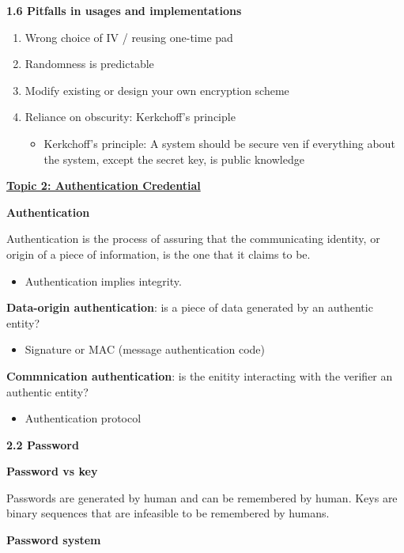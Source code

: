 \documentclass[landscape,a4paper]{extarticle}
\begin{document}
\begin{multicols*}{5}
    \textbf{1.6 Pitfalls in usages and implementations}
    \begin{enumerate}
        \item Wrong choice of IV / reusing one-time pad
        \item Randomness is predictable
        \item Modify existing or design your own encryption scheme
        \item Reliance on obscurity: Kerkchoff's principle
        \begin{itemize}
            \item Kerkchoff's principle: A system should be secure ven if everything about the
            system, except the secret key, is public knowledge
        \end{itemize}
    \end{enumerate}

    \textbf{\uline{Topic 2: Authentication Credential}}

    \textbf{Authentication}

    Authentication is the process of assuring that the communicating identity, or origin of a
    piece of information, is the one that it claims to be.

    \begin{itemize}
        \item Authentication implies integrity.
    \end{itemize}

    \textbf{Data-origin authentication}: is a piece of data generated by an authentic entity?
    \begin{itemize}
        \item Signature or MAC (message authentication code)
    \end{itemize}

    \textbf{Commnication authentication}: is the enitity interacting with the verifier an authentic entity?
    \begin{itemize}
        \item Authentication protocol
    \end{itemize}

    \textbf{2.2 Password}

    \textbf{Password vs key}

    Passwords are generated by human and can be remembered by human. Keys are binary sequences that are infeasible to be 
    remembered by humans.

    \textbf{Password system}


\end{multicols*}
\end{document}
